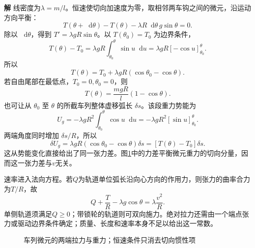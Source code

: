 \documentclass[11pt,openany,fontset=fandol]{ctexbook}
\theoremstyle{definition}\newtheorem{example}{例}[chapter]\newtheorem{exercise}{习题}[chapter]
\newcommand{\SolutionStart}{\par\medskip\ifdim\pagetotal>0pt\ifdim\dimexpr\pagegoal-\pagetotal\relax<3\baselineskip\newpage\fi\fi\noindent\textbf{解}\quad\ignorespaces}
\newenvironment{solution}{\SolutionStart}{\par\medskip}
\newcommand{\dd}{\mathop{}\!\mathrm d}\newcommand{\ee}{\mathrm e}\newcommand{\vct}[1]{\bm{#1}}
\begin{document}
\begin{solution}
线密度为$\lambda=m/l$。恒速使切向加速度为零，取相邻两车钩之间的微元，沿运动方向平衡：
\[
 T(\theta+\dd\theta)-T(\theta)-\lambda R\dd\theta\,g\sin\theta=0.
\]
除以 $\dd\theta$，得到 $T'=\lambda gR\sin\theta$。以 $T(\theta_0)=T_0$ 为边界条件，
\[
T(\theta)-T_0=\lambda gR\int_{\theta_0}^\theta\sin u\dd u
=\lambda gR[-\cos u]_{\theta_0}^\theta.
\]
所以
\[
 \boxed{T(\theta)=T_0+\lambda gR(\cos\theta_0-\cos\theta)}.
\]
若自由尾部在最低点，$T_0=0,\theta_0=0$，则
\[
 \boxed{T(\theta)=\frac{mgR}{l}(1-\cos\theta)}.
\]
也可让从 $\theta_0$ 至 $\theta$ 的所截车列整体虚移弧长 $\delta s$。该段重力势能为
\[
U_g=-\lambda gR^2\int_{\theta_0}^\theta\cos u\dd u
=-\lambda gR^2[\sin u]_{\theta_0}^\theta.
\]
两端角度同时增加 $\delta s/R$，所以
\[
 \delta U_g=\lambda gR(\cos\theta_0-\cos\theta)\delta s
           =[T(\theta)-T_0]\delta s.
\]
这从势能变化直接给出了同一张力差。图\ref{mp5:fig:hw:l5-32b-s}中的力差平衡微元重力的切向分量，因而这一张力差与$v$无关。

速率进入法向方程。若$Q$为轨道单位弧长沿向心方向的作用力，则张力的曲率合力为$T/R$，故
\[
 Q+\frac TR-\lambda g\cos\theta=\lambda\frac{v^2}{R}.
\]
单侧轨道须满足$Q\ge0$；带锁轮的轨道则可双向施力。绝对拉力还需由一个端点张力或驱动边界条件确定；质量、长度和速率本身不足以给出这一常数。


\begin{figure}[H]\centering
{}
\caption{车列微元的两端拉力与重力；恒速条件只消去切向惯性项}\label{mp5:fig:hw:l5-32b-s}
\end{figure}

\end{solution}
\end{document}
